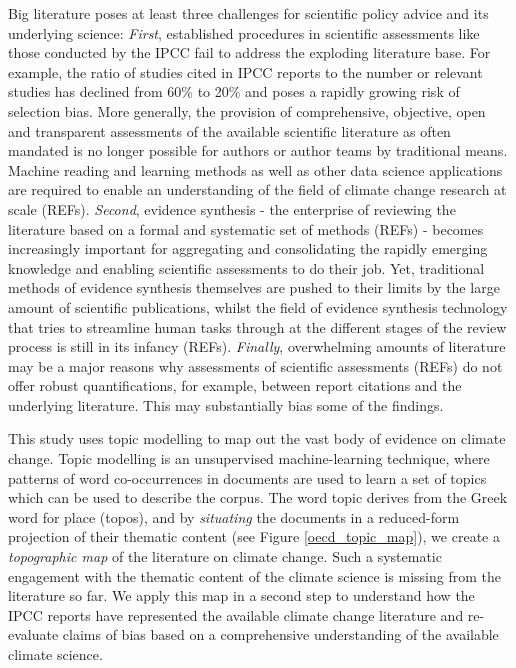 \documentclass{article}
\begin{document}
\begin{linenumbers}
		Big literature poses at least three challenges for scientific policy advice and its underlying science: \emph{First}, established procedures in scientific assessments like those conducted by the IPCC fail to address the exploding literature base. For example, the ratio of studies cited in IPCC reports to the number or relevant studies has declined from 60\% to 20\%  \cite{Minx2017l} and poses a rapidly growing risk of selection bias. More generally, the provision of comprehensive, objective, open and transparent assessments of the available scientific literature as often mandated is no longer possible for authors or author teams by traditional means. Machine reading and learning methods as well as other data science applications are required to enable an understanding of the field of climate change research at scale (REFs). \emph{Second}, evidence synthesis - the enterprise of reviewing the literature based on a formal and systematic set of methods (REFs) - becomes increasingly important for aggregating and consolidating the rapidly emerging knowledge and enabling scientific assessments to do their job. Yet, traditional methods of evidence synthesis themselves are pushed to their limits by the large amount of scientific publications, whilst the field of evidence synthesis technology that tries to streamline human tasks through  at the different stages of the review process is still in its infancy (REFs). \emph{Finally}, overwhelming amounts of literature may be a major reasons why assessments of scientific assessments (REFs) do not offer robust quantifications, for example, between report citations and the underlying literature. This may substantially bias some of the findings.
		
		This study uses topic modelling \cite{Blei2010} to map out the vast body of evidence on climate change. Topic modelling is an unsupervised machine-learning technique, where patterns of word co-occurrences in documents are used to learn a set of topics which can be used to describe the corpus. The word topic derives from the Greek word for place (topos), and by \textit{situating} the documents in a reduced-form projection of their thematic content (see Figure \ref{oecd_topic_map}), we create a \textit{topographic map} of the literature on climate change. Such a systematic engagement with the thematic content of the climate science is missing from the literature so far.%
		We apply this map in a second step to understand how the IPCC reports have represented the available climate change literature and re-evaluate claims of bias based on a comprehensive understanding of the available climate science. 
		

\end{linenumbers}
\end{document}
